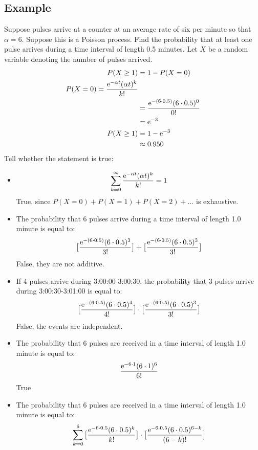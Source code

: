 \documentclass[letterpaper, 12pt]{math}
\begin{document}
\subsection*{Example}
Suppose pulses arrive at a counter at an average rate of six per minute so that
\( \alpha = 6 \). Suppose this is a Poisson process. Find the probability that
at least one pulse arrives during a time interval of length 0.5 minutes. Let
\( X \) be a random variable denoting the number of pulses arrived.
\begin{align*}
  P(X\geq 1) &= 1-P(X=0) \\
  P(X=0) = \frac{\mathrm{e}^{-\alpha t}(\alpha t)^{k}}{k!} \\
  &= \frac{\mathrm{e}^{-(6\cdot 0.5)}(6\cdot 0.5)^{0}}{0!} \\
  &= \mathrm{e}^{-3} \\
  P(X\geq 1) &= 1-\mathrm{e}^{-3} \\
  &\approx 0.950
\end{align*}
Tell whether the statement is true:
\begin{itemize}
  \item
    \[ \sum_{k=0}^{\infty}\frac{\mathrm{e}^{-\alpha t}(\alpha t)^{k}}{k!} = 1 \]
    True, since \( P(X=0)+P(X=1)+P(X=2)+\dots \) is exhaustive.
  \item The probability that 6 pulses arrive during a time interval of length
    1.0 minute is equal to:
    \[ \big[\frac{\mathrm{e}^{-(6\cdot 0.5)}(6\cdot 0.5)^{3}}{3!}\big] +
       \big[\frac{\mathrm{e}^{-(6\cdot 0.5)}(6\cdot 0.5)^{3}}{3!}\big] \]
    False, they are not additive.
  \item If 4 pulses arrive during 3:00:00-3:00:30, the probability that 3 pulses
    arrive during 3:00:30-3:01:00 is equal to:
    \[ \big[\frac{\mathrm{e}^{-(6\cdot 0.5)}(6\cdot 0.5)^{4}}{4!}\big]\cdot
       \big[\frac{\mathrm{e}^{-(6\cdot 0.5)}(6\cdot 0.5)^{3}}{3!}\big] \]
    False, the events are independent.
  \item The probability that 6 pulses are received in a time interval of
    length 1.0 minute is equal to:
    \[ \frac{\mathrm{e}^{-6\cdot 1}(6\cdot 1)^{6}}{6!} \]
    True
  \item The probability that 6 pulses are received in a time interval of
    length 1.0 minute is equal to:
    \[ \sum_{k=0}^{6}\big[\frac{\mathrm{e}^{-6\cdot 0.5}(6\cdot 0.5)^{k}}{k!}\big]\cdot
       \big[\frac{\mathrm{e}^{-6\cdot 0.5}(6\cdot 0.5)^{6-k}}{(6-k)!}\big] \]
\end{itemize}
\end{document}
